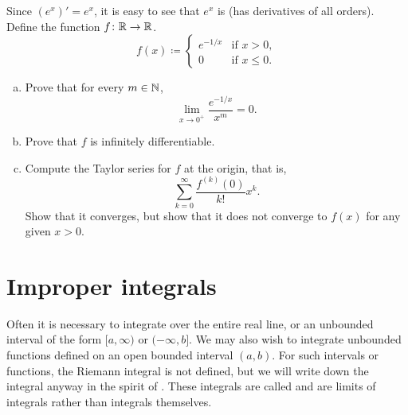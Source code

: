 \begin{exercise}\label{exercise:nonanalytic}
Since $(e^x)' = e^x$, it is easy to see that $e^x$ is
(has derivatives of all orders).  Define the function $f \colon {\mathbb{R}} \to {\mathbb{R}}$.
\begin{equation*}
f(x) \coloneqq \begin{cases}
e^{-1/x} & \text{if } x > 0, \\
0 & \text{if } x \leq 0.
\end{cases}
\end{equation*}
\begin{enumerate}[a)]
\item
Prove that for every $m \in {\mathbb{N}}$,
\begin{equation*}
\lim_{x \to 0^+} \frac{e^{-1/x}}{x^m} = 0 .
\end{equation*}
\item
Prove that $f$ is infinitely differentiable.
\item
Compute the Taylor series for $f$ at the origin, that is,
\begin{equation*}
\sum_{k=0}^\infty
\frac{f^{(k)}(0)}{k!}x^k .
\end{equation*}
Show that it converges, but show that it does not converge to $f(x)$
for any given $x > 0$.
\end{enumerate}
\end{exercise}


\sectionnewpage
\section{Improper integrals}
\label{sec:impropriemann}



Often it is necessary to integrate over the
entire real line, or an unbounded interval of the form $[a,\infty)$ or
$(-\infty,b]$.  We may also wish to integrate unbounded functions
defined on an open bounded interval $(a,b)$.
For such intervals or functions, the Riemann integral is not defined,
but we will write down
the integral anyway in the spirit of .
These integrals are called \emph{}
and are limits
of integrals rather than integrals themselves.


